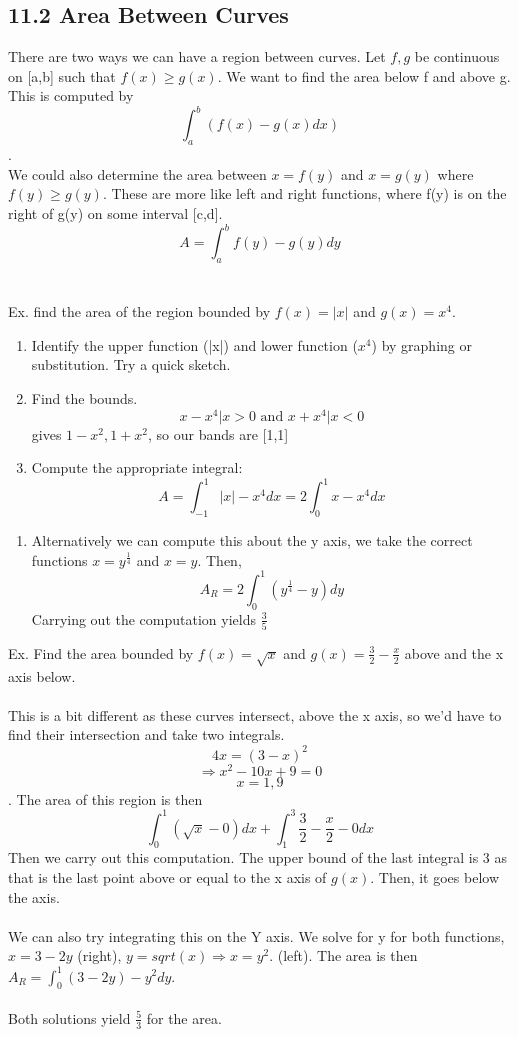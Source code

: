 \documentclass[twocolumn, 12pt]{report}
\begin{document}
\subsection{11.2 Area Between Curves}
There are two ways we can have a region between curves. Let $f,g$ be continuous on  [a,b] such that $f(x) \geq g(x)$. We want to find the area below f and above g. This is computed by $$\int_a^b (f(x)-g(x) dx)$$. \\ We could also determine the area between $x = f(y)$ and $x = g(y)$ where $f(y) \geq g(y)$. These are more like left and right functions, where f(y) is on the right of g(y) on some interval [c,d]. $$A = \int_a^b f(y)-g(y) dy$$ \\\\ Ex. find the area of the region bounded by $f(x) = |x|$ and $g(x) = x^4$.
\begin{enumerate}
  \item Identify the upper function (|x|) and lower function ($x^4$) by graphing or substitution. Try a quick sketch.
  \item Find the bounds. $${x-x^4 | x  > 0} \text { and }{x + x^4 | x < 0}$$ gives $1-x^2, 1+x^2$, so our bands are [1,1]
  \item Compute the appropriate integral: $$A = \int_{-1}^1 |x|-x^4 dx = 2 \int_0^1  x-x^4 dx$$
\end{enumerate}
\begin{enumerate}
  \item Alternatively we can compute this about the y axis, we take the correct functions $x = y^\frac{1}{4}$ and $x=y$. Then, $$A_R = 2\int_0^1 (y^\frac{1}{4} - y )dy$$ Carrying out the computation yields $\frac{3}{5}$
\end{enumerate}

Ex. Find the area bounded by $f(x) = \sqrt x$ and $g(x) = \frac{3}{2} - \frac{x}{2}$ above and the x axis below. \\\\ This is a bit different as these curves intersect, above the x axis, so we'd have to find their intersection and take two integrals. $$4x = (3-x)^2$$  $$\Rightarrow x^2-10x + 9 = 0$$ $$x = 1, 9$$. The area of this region is then $$ \int_0^1 (\sqrt{x} - 0) dx + \int_1^3 \frac{3}{2} - \frac{x}{2}-0 dx$$
Then we carry out this computation. The upper bound of the last integral is 3 as that is the last point above or equal to the x axis of $g(x)$. Then, it goes below the axis. \\\\ We can also try integrating this on the Y axis. We solve for y for both functions, $x = 3-2y$ (right), $y= sqrt(x) \Rightarrow x=y^2$. (left). The area is then $A_R = \int_0^1 (3-2y)-y^2 dy$. \\\\ Both solutions yield $\frac{5}{3}$ for the area.\\\\
\end{document}
